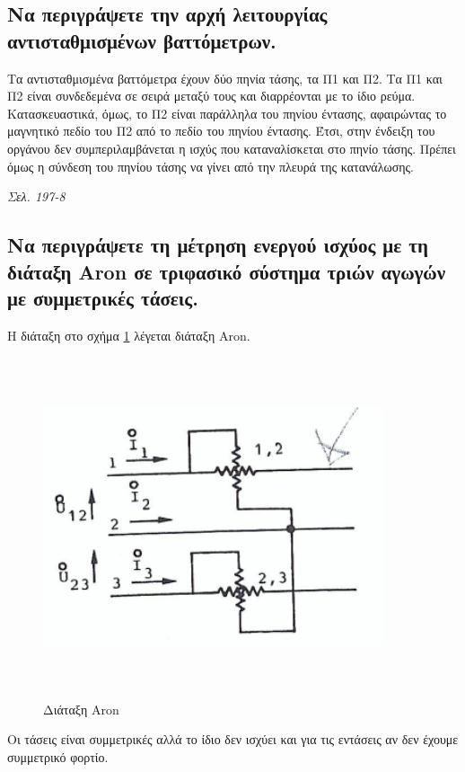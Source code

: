 \documentclass{article}
\begin{document}
\subsection{Να περιγράψετε την αρχή λειτουργίας αντισταθμισμένων βαττόμετρων.}
Τα αντισταθμισμένα βαττόμετρα έχουν δύο πηνία τάσης, τα Π1 και Π2. Τα Π1 και Π2 είναι συνδεδεμένα σε σειρά μεταξύ τους και διαρρέονται με το ίδιο ρεύμα. Κατασκευαστικά, 
όμως, το Π2 είναι παράλληλα του πηνίου έντασης, αφαιρώντας το μαγνητικό πεδίο του Π2 από το πεδίο του πηνίου έντασης. Έτσι, στην ένδειξη του οργάνου δεν 
συμπεριλαμβάνεται η ισχύς που καταναλίσκεται στο πηνίο τάσης. Πρέπει όμως η σύνδεση του πηνίου τάσης να γίνει από την πλευρά της κατανάλωσης.

\emph{Σελ. 197-8}

\subsection{Να περιγράψετε τη μέτρηση ενεργού ισχύος με τη διάταξη \foreignlanguage{english}{Aron} σε τριφασικό σύστημα τριών αγωγών με συμμετρικές τάσεις.}
Η διάταξη στο σχήμα \ref{diataksiaron1} λέγεται διάταξη \foreignlanguage{english}{Aron}.

\begin{figure}[h!]
    \includegraphics[width=10cm, height=10cm, keepaspectratio]{diataksiaron1.png}
    \caption{Διάταξη \foreignlanguage{english}{Aron}}
    \label{diataksiaron1}
\end{figure}
Οι τάσεις είναι συμμετρικές αλλά το ίδιο δεν ισχύει και για τις εντάσεις αν δεν έχουμε συμμετρικό φορτίο. 
\end{document}
